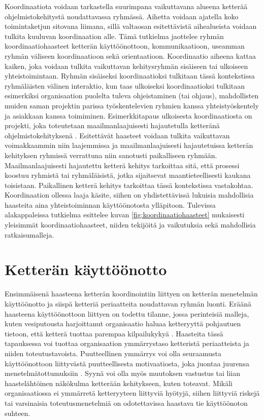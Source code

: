 Koordinaatiota voidaan tarkastella suurimpana vaikuttavana alueena ketterää ohjelmistokehitystä noudattavassa ryhmässä. Aihetta voidaan ajatella koko toimintaketjun sitovana liimana, sillä valtaosan esitettävistä aihealueista voidaan tulkita kuuluvan koordinaation alle. Tämä tutkielma jaottelee ryhmän koordinaatiohaasteet ketterän käyttöönottoon, kommunikaatioon, useamman ryhmän väliseen koordinaatioon sekä orientaatioon. Koordinaatio aiheena kattaa kaiken, joka voidaan tulkita vaikuttavan kehitysryhmän sisäiseen tai ulkoiseen yhteistoimintaan. Ryhmän sisäiseksi koordinaatioksi tulkitaan tässä kontekstissa ryhmäläisten välinen interaktio, kun taas ulkoiseksi koordinaatioksi tulkitaan esimerkiksi organisaation puolelta tuleva ohjeistaminen (tai ohjaus), mahdollisten muiden saman projektin parissa työskentelevien ryhmien kanssa yhteistyöskentely ja asiakkaan kanssa toimiminen. Esimerkkitapaus ulkoisesta koordinaatiosta on projekti, joka toteutetaan maailmanlaajuisesti hajautetulla ketteränä ohjelmistokehityksenä \cite{ALZOUBI201622}. Esitettävät haasteet voidaan tulkita vaikuttavan voimakkaammin niin laajemmissa ja maailmanlaajuisesti hajautetuissa ketterän kehityksen ryhmissä verrattuna niin sanotusti paikalliseen ryhmään. Maailmanlaajuisesti hajautettu ketterä kehitys tarkoittaa sitä, että prosessi koostuu ryhmistä tai ryhmäläisistä, jotka sijaitsevat maantieteellisesti kaukana toisistaan. Paikallinen ketterä kehitys tarkoittaa tässä kontekstissa vastakohtaa. Koordinaation ollessa laaja käsite, siihen on yhdistettävissä lukuisia mahdollisia haasteita aina yhteistoiminnan käyttöönotosta ylläpitoon. Tulevissa alakappaleissa tutkielma esittelee kuvan \ref{fig:koordinaatiohaasteet} mukaisesti yleisimmät koordinaatiohaasteet, niiden tekijöitä ja vaikutuksia sekä mahdollisia ratkaisumalleja.

\section{Ketterän käyttöönotto}

Ensimmäisenä haasteena ketterän koordinointiin liittyen on ketterän menetelmän käyttöönotto ja siispä ketteriä periaatteita noudattavan ryhmän luonti. Eräänä haasteena käyttöönottoon liittyen on todettu tilanne, jossa perinteisiä malleja, kuten vesiputousta harjoittanut organisaatio haluaa ketteryyttä pohjautuen tietoon, että ketterä tuottaa parempaa kilpailukykyä \cite{MCKNIGHT2014168}. Haasteita tässä tapauksessa voi tuottaa organisaation ymmärrystaso ketteristä periaatteista ja niiden toteutustavoista. Puutteellinen ymmärrys voi olla seuraamusta käyttöönottoon liittyvästä puutteellisesta motivaatiosta, joka juontaa juurensa menetelmätottumuksiin \cite{GREGORY201692}. Syynä voi olla myös muutoksen vastustus tai liian haastelähtöinen näkökulma ketterään kehitykseen, kuten \cite{SELLERISILVA201520} toteavat. Mikäli organisaatiossa ei ymmärretä ketteryyteen liittyviä hyötyjä, siihen liittyviä riskejä tai varsinaisia toteutusmenetelmiä on odotettavissa haastava tie käyttöönoton suhteen.

